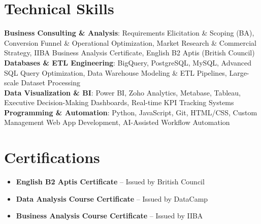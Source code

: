 \documentclass[letterpaper,11pt]{article}
\newcommand{\resumeItem}[1]{
  \item\small{
    {#1 \vspace{1pt}}
  }
}
\newcommand{\resumeItemListStart}{\begin{itemize}[leftmargin=0.15in, itemsep=2.5pt, topsep=2pt, parsep=1.5pt]}
\newcommand{\resumeItemListEnd}{\end{itemize}\vspace{2pt}}
\begin{document}
\section*{Technical Skills}
 \begin{itemize}[leftmargin=0.15in, label={}]
    \small{\item{
     \textbf{Business Consulting \& Analysis}: {Requirements Elicitation \& Scoping (BA), Conversion Funnel \& Operational Optimization, Market Research \& Commercial Strategy, IIBA Business Analysis Certificate, English B2 Aptis (British Council)} \\ \vspace{2pt}
     \textbf{Databases \& ETL Engineering}: {BigQuery, PostgreSQL, MySQL, Advanced SQL Query Optimization, Data Warehouse Modeling \& ETL Pipelines, Large-scale Dataset Processing} \\ \vspace{2pt}
     \textbf{Data Visualization \& BI}: {Power BI, Zoho Analytics, Metabase, Tableau, Executive Decision-Making Dashboards, Real-time KPI Tracking Systems} \\ \vspace{2pt}
     \textbf{Programming \& Automation}: {Python, JavaScript, Git, HTML/CSS, Custom Management Web App Development, AI-Assisted Workflow Automation}
    }}
 \end{itemize}

\section*{Certifications}
        \resumeItemListStart
      \resumeItem{\textbf{English B2 Aptis Certificate} -- Issued by British Council}
      \resumeItem{\textbf{Data Analysis Course Certificate} -- Issued by DataCamp}
      \resumeItem{\textbf{Business Analysis Course Certificate} -- Issued by IIBA}
      \resumeItemListEnd

\end{document}
